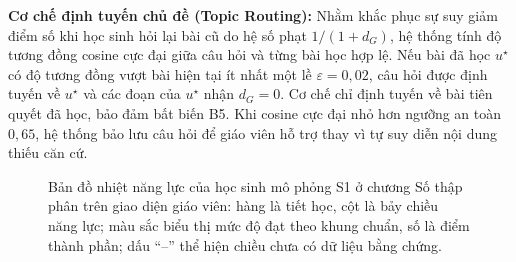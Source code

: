 \documentclass[10pt,a4paper,twocolumn]{article}
\begin{document}
\textbf{Cơ chế định tuyến chủ đề (Topic Routing):} Nhằm khắc phục sự suy giảm điểm số khi học sinh hỏi lại bài cũ do hệ số phạt $1/(1+d_G)$, hệ thống tính độ tương đồng cosine cực đại giữa câu hỏi và từng bài học hợp lệ. Nếu bài đã học $u^\star$ có độ tương đồng vượt bài hiện tại ít nhất một lề $\varepsilon=0{,}02$, câu hỏi được định tuyến về $u^\star$ và các đoạn của $u^\star$ nhận $d_G=0$. Cơ chế chỉ định tuyến về bài tiên quyết đã học, bảo đảm bất biến B5. Khi cosine cực đại nhỏ hơn ngưỡng an toàn $0{,}65$, hệ thống bảo lưu câu hỏi để giáo viên hỗ trợ thay vì tự suy diễn nội dung thiếu căn cứ.

\begin{figure}[t]
\centering
\begin{minipage}[t]{0.435\textwidth}\vspace{0pt}
\label{tab:baselines}

\end{minipage}\hfill
\begin{minipage}[t]{0.545\textwidth}\vspace{0pt}
\centering

\label{fig:baselines}
\end{minipage}
\vspace{4pt}

\caption{Bản đồ nhiệt năng lực của học sinh mô phỏng S1 ở chương Số thập phân trên giao diện giáo viên: hàng là tiết học, cột là bảy chiều năng lực; màu sắc biểu thị mức độ đạt theo khung chuẩn, số là điểm thành phần; dấu ``--'' thể hiện chiều chưa có dữ liệu bằng chứng.}\label{fig:heat}
\end{figure}
\end{document}
